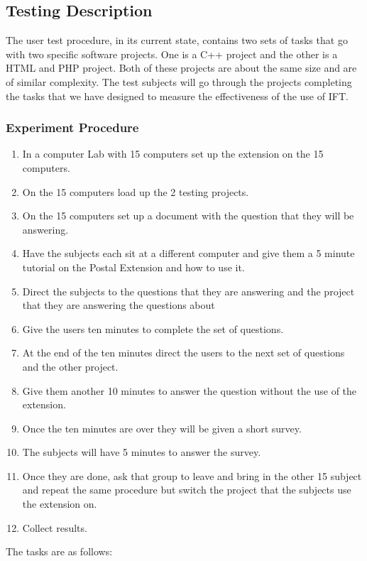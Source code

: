 \documentclass[letterpaper,10pt,titlepage,draftclsnofoot,onecolumn,onesided] {IEEEtran}
\begin{document}
	\subsection{Testing Description}
	The user test procedure, in its current state, contains two sets of tasks that go with two specific software projects. 
	One is a C++ project and the other is a HTML and PHP project. 
	Both of these projects are about the same size and are of similar complexity. 
	The test subjects will go through the projects completing the tasks that we have designed to measure the effectiveness of the use of IFT. 
	
	\subsubsection{Experiment Procedure}
	\begin{enumerate}
		\item	In a computer Lab with 15 computers set up the extension on the 15 computers.
		\item	On the 15 computers load up the 2 testing projects.
		\item	On the 15 computers set up a document with the question that they will be answering.
		\item	Have the subjects each sit at a different computer and give them a 5 minute tutorial on the Postal Extension and how to use it.
		\item	Direct the subjects to the questions that they are answering and the project that they are answering the questions about
		\item	Give the users ten minutes to complete the set of questions.
		\item	At the end of the ten minutes direct the users to the next set of questions and the other project. 
		\item 	Give them another 10 minutes to answer the question without the use of the extension.
		\item	Once the ten minutes are over they will be given a short survey. 
		\item	The subjects will have 5 minutes to answer the survey.
		\item	Once they are done, ask that group to leave and bring in the other 15 subject and repeat the same procedure but switch the project that the subjects use the extension on. 
		\item 	Collect results.
	\end{enumerate}
	
	The tasks are as follows: 
	
\end{document}
